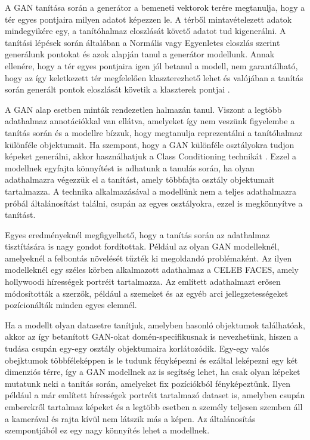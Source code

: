 
A GAN tanítása során a generátor a bemeneti vektorok terére megtanulja, hogy a tér egyes pontjaira milyen adatot képezzen le. A térből mintavételezett adatok mindegyikére egy, a tanítóhalmaz eloszlását követő adatot tud kigenerálni.
A tanítási lépések során általában a Normális vagy Egyenletes eloszlás szerint generálunk pontokat és azok alapján tanul a generátor modellunk. Annak ellenére, hogy a tér egyes pontjaira igen jól betanul a modell, nem garantálható, hogy az így keletkezett tér megfelelően klaszterezhető lehet és valójában a tanítás során generált pontok eloszlását követik a klaszterek pontjai \cite{mukherjee2019clustergan}.


A GAN alap esetben minták rendezetlen halmazán tanul. Viszont a legtöbb adathalmaz annotációkkal van ellátva, amelyeket így nem veszünk figyelembe a tanítás során és a modellre bízzuk, hogy megtanulja reprezentálni a tanítóhalmaz különféle objektumait. Ha szempont, hogy a GAN különféle osztályokra tudjon képeket generálni, akkor használhatjuk a Class Conditioning technikát \cite{mirza2014conditional}. Ezzel a modellnek egyfajta könnyítést is adhatunk a tanulás során, ha olyan adathalmazra végezzük el a tanítást, amely többfajta osztály objektumait tartalmazza. A technika alkalmazásával a modellünk nem a teljes adathalmazra próbál általánosítást találni, csupán az egyes osztályokra, ezzel is megkönnyítve a tanítást.

Egyes eredményeknél megfigyelhető, hogy a tanítás során az adathalmaz tisztítására is nagy gondot fordítottak. Például az olyan GAN modelleknél, amelyeknél a felbontás növelését tűzték ki megoldandó problémaként. Az ilyen modelleknél egy széles körben alkalmazott adathalmaz a CELEB FACES, amely hollywoodi hírességek portréit tartalmazza. Az említett adathalmazt erősen módosították a szerzők, például a szemeket és az egyéb arci jellegzetességeket pozícionálták minden egyes elemnél.

Ha a modellt olyan datasetre tanítjuk, amelyben hasonló objektumok találhatóak, akkor az így betanított GAN-okat domén-specifikusnak is nevezhetünk, hiszen a tudása csupán egy-egy osztály objektumaira korlátozódik. Egy-egy valós obejktumok többféleképpen is le tudunk fényképezni és ezáltal leképezni egy két dimenziós térre, így a GAN modellnek az is segítség lehet, ha csak olyan képeket mutatunk neki a tanítás során, amelyeket fix pozíciókból fényképeztünk.
Ilyen például a már említett hírességek portréit tartalmazó dataset is, amelyben csupán emberekről tartalmaz képeket és a legtöbb esetben a személy teljesen szemben áll a kamerával és rajta kívül nem látszik más a képen. Az általánosítás szempontjából ez egy nagy könnyítés lehet a modellnek.

